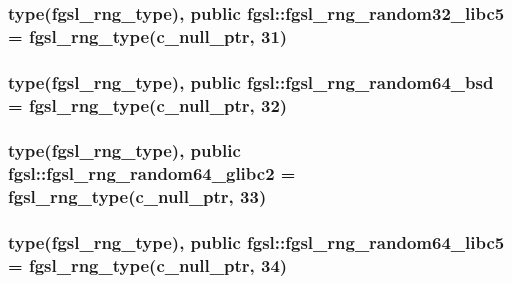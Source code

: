 \hypertarget{classfgsl_a85c8b85216d7705c54a071e06a65d871}{
\subsubsection[{fgsl\-\_\-rng\-\_\-random32\-\_\-libc5}]{\setlength{\rightskip}{0pt plus 5cm}type({\bf fgsl\-\_\-rng\-\_\-type}), public fgsl\-::fgsl\-\_\-rng\-\_\-random32\-\_\-libc5 = {\bf fgsl\-\_\-rng\-\_\-type}(c\-\_\-null\-\_\-ptr, 31)}}\label{classfgsl_a85c8b85216d7705c54a071e06a65d871}
\hypertarget{classfgsl_a4f1fadb8ae8e69bc97fa0ce10b8c2669}{
\subsubsection[{fgsl\-\_\-rng\-\_\-random64\-\_\-bsd}]{\setlength{\rightskip}{0pt plus 5cm}type({\bf fgsl\-\_\-rng\-\_\-type}), public fgsl\-::fgsl\-\_\-rng\-\_\-random64\-\_\-bsd = {\bf fgsl\-\_\-rng\-\_\-type}(c\-\_\-null\-\_\-ptr, 32)}}\label{classfgsl_a4f1fadb8ae8e69bc97fa0ce10b8c2669}
\hypertarget{classfgsl_afa30a9f9486fc4a3ebc5c98fdf7c2734}{
\subsubsection[{fgsl\-\_\-rng\-\_\-random64\-\_\-glibc2}]{\setlength{\rightskip}{0pt plus 5cm}type({\bf fgsl\-\_\-rng\-\_\-type}), public fgsl\-::fgsl\-\_\-rng\-\_\-random64\-\_\-glibc2 = {\bf fgsl\-\_\-rng\-\_\-type}(c\-\_\-null\-\_\-ptr, 33)}}\label{classfgsl_afa30a9f9486fc4a3ebc5c98fdf7c2734}
\hypertarget{classfgsl_a5d485fce442bdf380a13906f23f519cb}{
\subsubsection[{fgsl\-\_\-rng\-\_\-random64\-\_\-libc5}]{\setlength{\rightskip}{0pt plus 5cm}type({\bf fgsl\-\_\-rng\-\_\-type}), public fgsl\-::fgsl\-\_\-rng\-\_\-random64\-\_\-libc5 = {\bf fgsl\-\_\-rng\-\_\-type}(c\-\_\-null\-\_\-ptr, 34)}}\label{classfgsl_a5d485fce442bdf380a13906f23f519cb}
